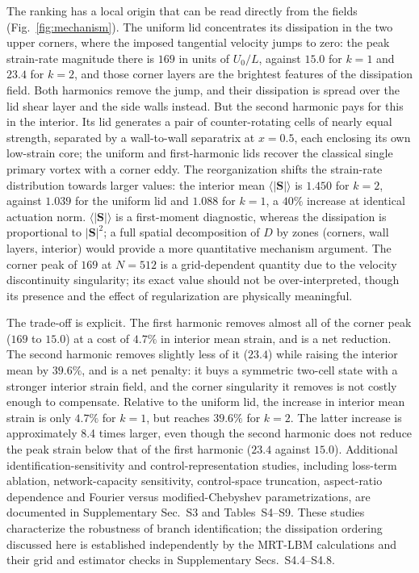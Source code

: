 \documentclass[11pt,a4paper]{article}
\newcommand{\Sij}{\mathbf{S}}
\begin{document}
The ranking has a local origin that can be read directly from the fields
(Fig.~\ref{fig:mechanism}). The uniform lid concentrates its dissipation in the
two upper corners, where the imposed tangential velocity jumps to zero: the peak
strain-rate magnitude there is $169$ in units of $U_0/L$, against $15.0$ for
$k=1$ and $23.4$ for $k=2$, and those corner layers are the brightest features of
the dissipation field. Both harmonics remove the jump, and their dissipation is
spread over the lid shear layer and the side walls instead. But the second
harmonic pays for this in the interior. Its lid generates a pair of
counter-rotating cells of nearly equal strength, separated by a wall-to-wall
separatrix at $x=0.5$, each enclosing its own low-strain core; the uniform and
first-harmonic lids recover the classical single primary vortex with a corner
eddy. The reorganization shifts the strain-rate distribution towards larger
values: the interior mean $\langle|\Sij|\rangle$ is $1.450$ for $k=2$, against
$1.039$ for the uniform lid and $1.088$ for $k=1$, a $40\%$ increase at identical
actuation norm. $\langle|\Sij|\rangle$ is a first-moment diagnostic,
whereas the dissipation is proportional to $|\Sij|^2$; a full spatial decomposition
of $D$ by zones (corners, wall layers, interior) would provide a more quantitative
mechanism argument. The corner peak of $169$ at $N=512$ is a grid-dependent
quantity due to the velocity discontinuity singularity; its exact value should not
be over-interpreted, though its presence and the effect of regularization are
physically meaningful.

The trade-off is explicit. The first harmonic removes almost all of the corner
peak ($169$ to $15.0$) at a cost of $4.7\%$ in interior mean strain, and is a net
reduction. The second harmonic removes slightly less of it ($23.4$) while raising
the interior mean by $39.6\%$, and is a net penalty: it buys a symmetric two-cell
state with a stronger interior strain field, and the corner singularity it removes
is not costly enough to compensate. Relative to the uniform lid, the increase in
interior mean strain is only $4.7\%$ for $k=1$, but reaches $39.6\%$ for $k=2$.
The latter increase is approximately 8.4 times larger, even though the second
harmonic does not reduce the peak strain below that of the first harmonic ($23.4$
against $15.0$). Additional identification-sensitivity and control-representation
studies, including loss-term ablation, network-capacity sensitivity,
control-space truncation, aspect-ratio dependence and Fourier versus
modified-Chebyshev parametrizations, are documented in
Supplementary Sec.~S3 and Tables~S4--S9.
These studies characterize the robustness of branch identification;
the dissipation ordering discussed here is established independently
by the MRT-LBM calculations and their grid and estimator checks
in Supplementary Secs.~S4.4--S4.8.
\end{document}
